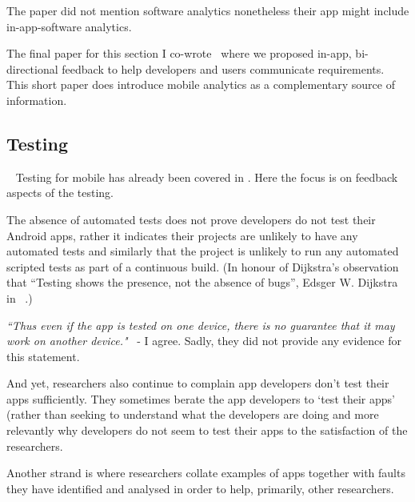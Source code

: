 The paper did not mention software analytics nonetheless their app might include in-app-software analytics.

The final paper for this section I co-wrote~ where we proposed in-app, bi-directional feedback to help developers and users communicate requirements. This short paper does introduce mobile analytics as a complementary source of information. 


\subsection{Testing}~\label{rw-testing-topic}
Testing for mobile has already been covered in . Here the focus is on feedback aspects of the testing.

The absence of automated tests does not prove developers do not test their Android apps, rather it indicates their projects are unlikely to have any automated tests and similarly that the project is unlikely to run any automated scripted tests as part of a continuous build. (In honour of Dijkstra's observation that ``Testing shows the presence, not the absence of bugs'', Edsger W. Dijkstra in ~.) %



\emph{``Thus even if the app is tested on one device, there is no guarantee that it may work on another device."}~ - I agree. Sadly, they did not provide any evidence for this statement.

And yet, researchers also continue to complain app developers don't test their apps sufficiently. They sometimes berate the app developers to `test their apps'~ (rather than seeking to understand what the developers are doing and more relevantly why developers do not seem to test their apps to the satisfaction of the researchers.

Another strand is where researchers collate examples of apps together with faults they have identified and analysed in order to help, primarily, other researchers. 

